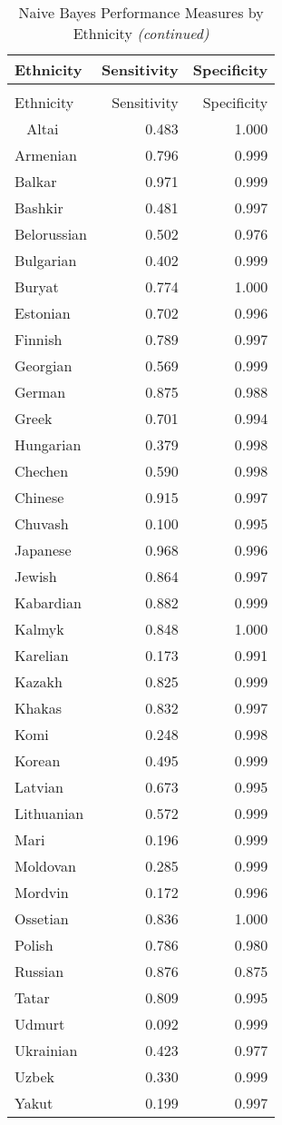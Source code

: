 \begingroup\fontsize{8}{10}\selectfont

\begin{longtable}{lrr}
\caption{\label{tab:sens_spec}Naive Bayes Performance Measures by Ethnicity}\\
\toprule
Ethnicity & Sensitivity & Specificity\\
\midrule
\endfirsthead
\caption[]{Naive Bayes Performance Measures by Ethnicity \textit{(continued)}}\\
\toprule
Ethnicity & Sensitivity & Specificity\\
\midrule
\endhead
\
\endfoot
\bottomrule
\endlastfoot
Altai & 0.483 & 1.000\\
Armenian & 0.796 & 0.999\\
Balkar & 0.971 & 0.999\\
Bashkir & 0.481 & 0.997\\
Belorussian & 0.502 & 0.976\\
Bulgarian & 0.402 & 0.999\\
Buryat & 0.774 & 1.000\\
Estonian & 0.702 & 0.996\\
Finnish & 0.789 & 0.997\\
Georgian & 0.569 & 0.999\\
German & 0.875 & 0.988\\
Greek & 0.701 & 0.994\\
Hungarian & 0.379 & 0.998\\
Chechen & 0.590 & 0.998\\
Chinese & 0.915 & 0.997\\
Chuvash & 0.100 & 0.995\\
Japanese & 0.968 & 0.996\\
Jewish & 0.864 & 0.997\\
Kabardian & 0.882 & 0.999\\
Kalmyk & 0.848 & 1.000\\
Karelian & 0.173 & 0.991\\
Kazakh & 0.825 & 0.999\\
Khakas & 0.832 & 0.997\\
Komi & 0.248 & 0.998\\
Korean & 0.495 & 0.999\\
Latvian & 0.673 & 0.995\\
Lithuanian & 0.572 & 0.999\\
Mari & 0.196 & 0.999\\
Moldovan & 0.285 & 0.999\\
Mordvin & 0.172 & 0.996\\
Ossetian & 0.836 & 1.000\\
Polish & 0.786 & 0.980\\
Russian & 0.876 & 0.875\\
Tatar & 0.809 & 0.995\\
Udmurt & 0.092 & 0.999\\
Ukrainian & 0.423 & 0.977\\
Uzbek & 0.330 & 0.999\\
Yakut & 0.199 & 0.997\\*
\end{longtable}\endgroup{}
